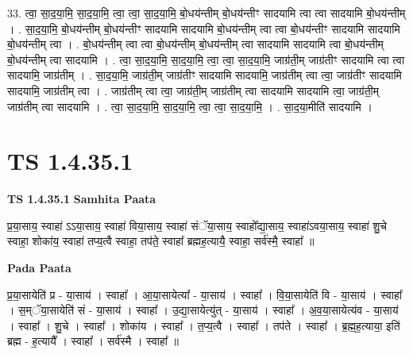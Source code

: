 \documentclass[17pt]{extarticle}
\begin{document}
33. त्वा॒ सा॒द॒या॒मि॒ सा॒द॒या॒मि॒ त्वा॒ त्वा॒ सा॒द॒या॒मि॒ बो॒धय॑न्तीम् बो॒धय॑न्तीꣳ सादयामि त्वा त्वा सादयामि बो॒धय॑न्तीम् । . सा॒द॒या॒मि॒ बो॒धय॑न्तीम् बो॒धय॑न्तीꣳ सादयामि सादयामि बो॒धय॑न्तीम् त्वा त्वा बो॒धय॑न्तीꣳ सादयामि सादयामि बो॒धय॑न्तीम् त्वा । . बो॒धय॑न्तीम् त्वा त्वा बो॒धय॑न्तीम् बो॒धय॑न्तीम् त्वा सादयामि सादयामि त्वा बो॒धय॑न्तीम् बो॒धय॑न्तीम् त्वा सादयामि । . त्वा॒ सा॒द॒या॒मि॒ सा॒द॒या॒मि॒ त्वा॒ त्वा॒ सा॒द॒या॒मि॒ जाग्र॑ती॒म् जाग्र॑तीꣳ सादयामि त्वा त्वा सादयामि॒ जाग्र॑तीम् । . सा॒द॒या॒मि॒ जाग्र॑ती॒म् जाग्र॑तीꣳ सादयामि सादयामि॒ जाग्र॑तीम् त्वा त्वा॒ जाग्र॑तीꣳ सादयामि सादयामि॒ जाग्र॑तीम् त्वा । . जाग्र॑तीम् त्वा त्वा॒ जाग्र॑ती॒म् जाग्र॑तीम् त्वा सादयामि सादयामि त्वा॒ जाग्र॑ती॒म् जाग्र॑तीम् त्वा सादयामि । . त्वा॒ सा॒द॒या॒मि॒ सा॒द॒या॒मि॒ त्वा॒ त्वा॒ सा॒द॒या॒मि॒ । . सा॒द॒या॒मीति॑ सादयामि । \newline
\pagebreak
{}
\section*{ TS 1.4.35.1 }

\textbf{TS 1.4.35.1 } \newline
\textbf{Samhita Paata} \newline

प्र॒या॒साय॒ स्वाहा॑ ऽऽया॒साय॒ स्वाहा॑ विया॒साय॒ स्वाहा॑ संॅया॒साय॒ स्वाहो᳚द्या॒साय॒ स्वाहा॑ऽवया॒साय॒ स्वाहा॑ शु॒चे स्वाहा॒ शोका॑य॒ स्वाहा॑ तप्य॒त्वै स्वाहा॒ तप॑ते॒ स्वाहा᳚ ब्रह्मह॒त्यायै॒ स्वाहा॒ सर्व॑स्मै॒ स्वाहा᳚ ॥ \newline

\textbf{Pada Paata} \newline

प्र॒या॒सायेति॑ प्र - या॒साय॑ । स्वाहा᳚ । आ॒या॒सायेत्या᳚ - या॒साय॑ । स्वाहा᳚ । वि॒या॒सायेति॑ वि - या॒साय॑ । स्वाहा᳚ । स॒म्ॅया॒सायेति॑ सं - या॒साय॑ । स्वाहा᳚ । उ॒द्या॒सायेत्यु॑त् - या॒साय॑ । स्वाहा᳚ । अ॒व॒या॒सायेत्य॑व - या॒साय॑ । स्वाहा᳚ । शु॒चे । स्वाहा᳚ । शोका॑य । स्वाहा᳚ । त॒प्य॒त्वै । स्वाहा᳚ । तप॑ते । स्वाहा᳚ । ब्र॒ह्म॒ह॒त्याया॒ इति॑ ब्रह्म - ह॒त्यायै᳚ । स्वाहा᳚ । सर्व॑स्मै । स्वाहा᳚ ॥  \newline
\end{document}
